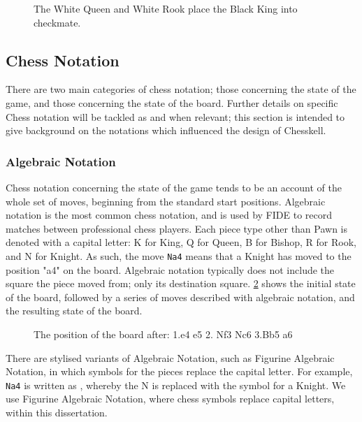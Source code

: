 \begin{figure}[h]
    \centering
    \showboard
    \caption{The White Queen and White Rook place the Black King into checkmate.}
    \label{checkmate}
\end{figure}

\subsection{Chess Notation}

There are two main categories of chess notation; those concerning the state of the game, and those concerning the state of the board. Further details on specific Chess notation will be tackled as and when relevant; this section is intended to give background on the notations which influenced the design of Chesskell.

\subsubsection{Algebraic Notation} \label{algebraicsection}

Chess notation concerning the state of the game tends to be an account of the whole set of moves, beginning from the standard start positions. Algebraic notation is the most common chess notation, and is used by FIDE to record matches between professional chess players. Each piece type other than Pawn is denoted with a capital letter: K for King, Q for Queen, B for Bishop, R for Rook, and N for Knight. As such, the move \texttt{Na4} means that a Knight has moved to the position "a4" on the board. Algebraic notation typically does not include the square the piece moved from; only its destination square. \cref{algebraicexample} shows the initial state of the board, followed by a series of moves described with algebraic notation, and the resulting state of the board.

\begin{figure}[h]
    \centering
    \newgame
    \showboard
    \caption{The position of the board after: 1.e4 e5 2. Nf3 Nc6 3.Bb5 a6}
    \label{algebraicexample}
\end{figure}

There are stylised variants of Algebraic Notation, such as Figurine Algebraic Notation, in which symbols for the pieces replace the capital letter. For example, \texttt{Na4} is written as , whereby the N is replaced with the symbol for a Knight. We use Figurine Algebraic Notation, where chess symbols replace capital letters, within this dissertation.

